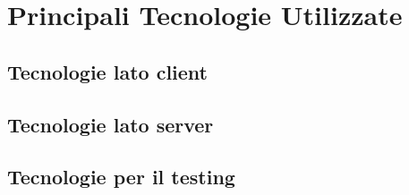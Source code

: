 \section{Principali Tecnologie Utilizzate}\label{tecnologie}

\subsection{Tecnologie lato client}\label{clientTec}

\subsection{Tecnologie lato server}\label{serverTec}

\subsection{Tecnologie per il testing}\label{testTec}